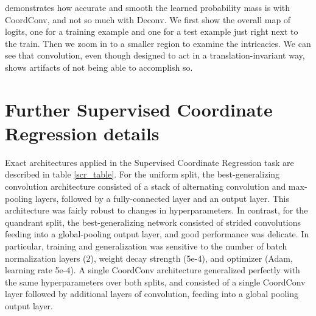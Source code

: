 \documentclass{article}
\begin{document}
 demonstrates how accurate and smooth the learned probability mass is with CoordConv, and not so much with Deconv. We first show the overall  map of logits, one for a training example and one for a test example just right next to the train. Then we zoom in to a smaller region to examine the intricacies. We can see that convolution, even though designed to act in a translation-invariant way, shows artifacts of not being able to accomplish so.



\section{Further Supervised Coordinate Regression details}

Exact architectures applied in the Supervised Coordinate Regression task are described in table \ref{scr_table}.
For the uniform split, the best-generalizing convolution architecture consisted of a stack of alternating
convolution and max-pooling layers, followed by a fully-connected layer and an output layer. This architecture
was fairly robust to changes in hyperparameters. In contrast, for the quandrant split, the best-generalizing
network consisted of strided convolutions feeding into a global-pooling output layer, and good performance
was delicate. In particular, training and generalization was sensitive to the number of batch normalization layers (2), weight decay strength (5e-4), and optimizer (Adam, learning rate 5e-4). A single CoordConv architecture generalized perfectly with the same hyperparameters over both splits, and consisted of a single CoordConv layer followed by additional layers of convolution, feeding into a global pooling output layer.
\end{document}
